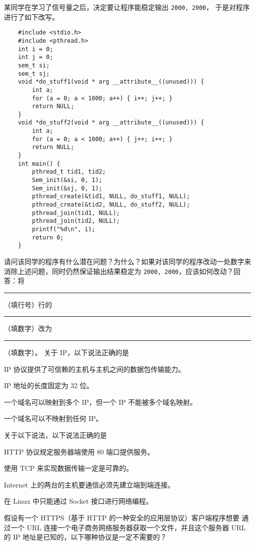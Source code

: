 \begin{problems}
            \qn 某同学在学习了信号量之后，决定要让程序能稳定输出 \verb|2000, 2000|， 于是对程序进行了如下改写。
            \begin{verbatim}
    #include <stdio.h>
    #include <pthread.h>
    int i = 0;
    int j = 0;
    sem_t si;
    sem_t sj;
    void *do_stuff1(void * arg __attribute__((unused))) {
        int a;
        for (a = 0; a < 1000; a++) { i++; j++; }
        return NULL;
    }
    void *do_stuff2(void * arg __attribute__((unused))) {
        int a;
        for (a = 0; a < 1000; a++) { j++; i++; }
        return NULL;
    }
    int main() {
        pthread_t tid1, tid2;
        Sem_init(&si, 0, 1);
        Sem_init(&sj, 0, 1);
        pthread_create(&tid1, NULL, do_stuff1, NULL); 
        pthread_create(&tid2, NULL, do_stuff2, NULL);
        pthread_join(tid1, NULL);
        pthread_join(tid2, NULL);
        printf("%d\n", i);
        return 0;
    }
        \end{verbatim}
        请问该同学的程序有什么潜在问题？为什么？如果对该同学的程序改动一处数字来消除上述问题，同时仍然保证输出结果稳定为 \verb|2000, 2000|，应该如何改动？回答：将 \rule{2.5cm}{0.25mm} （填行号）行的 \rule{2.5cm}{0.25mm}（填数字）改为 \rule{2.5cm}{0.25mm}（填数字）。
         关于 IP，以下说法正确的是
        \begin{choices}
            \item IP 协议提供了可信赖的主机与主机之间的数据包传输能力。
            \item IP 地址的长度固定为 32 位。
            \item 一个域名可以映射到多个 IP，但一个 IP 不能被多个域名映射。
            \item 一个域名可以不映射到任何 IP。
        \end{choices}
         关于以下说法，以下说法正确的是
        \begin{choices}
            \item HTTP 协议规定服务器端使用 80 端口提供服务。
            \item 使用 TCP 来实现数据传输一定是可靠的。
            \item Internet 上的两台的主机要通信必须先建立端到端连接。
            \item 在 Linux 中只能通过 Socket 接口进行网络编程。
        \end{choices}
         假设有一个 HTTPS（基于 HTTP 的一种安全的应用层协议）客户端程序想要 通过一个 URL 连接一个电子商务网络服务器获取一个文件，并且这个服务器 URL 的 IP 地址是已知的，以下哪种协议是一定不需要的？

\end{problems}
